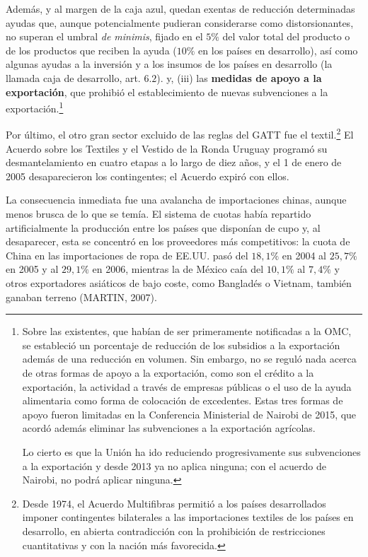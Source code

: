 \documentclass[10pt,a4paper]{article}
\begin{document}
{  Además, y al margen de la caja azul, quedan exentas de reducción determinadas ayudas que, aunque potencialmente pudieran considerarse como distorsionantes, no superan el umbral \textit{de minimis}, fijado en el $5\%$ del valor total del producto o de los productos que reciben la ayuda ($10\%$ en los países en desarrollo), así como algunas ayudas a la inversión y a los insumos de los países en desarrollo (la llamada caja de desarrollo, art. $6.2$).
} y, (iii) las \textbf{medidas de apoyo a la exportación}, que prohibió el establecimiento de nuevas subvenciones a la exportación.\footnote{%
  Sobre las existentes, que habían de ser primeramente notificadas a la OMC, se estableció un porcentaje de reducción de los subsidios a la exportación además de una reducción en volumen. Sin embargo, no se reguló nada acerca de otras formas de apoyo a la exportación, como son el crédito a la exportación, la actividad a través de empresas públicas o el uso de la ayuda alimentaria como forma de colocación de excedentes. Estas tres formas de apoyo fueron limitadas en la Conferencia Ministerial de Nairobi de 2015, que acordó además eliminar las subvenciones a la exportación agrícolas. 

Lo cierto es que la Unión ha ido reduciendo progresivamente sus subvenciones a la exportación y desde 2013 ya no aplica ninguna; con el acuerdo de Nairobi, no podrá aplicar ninguna.
}

Por último, el otro gran sector excluido de las reglas del GATT fue el textil.\footnote{%
  Desde 1974, el Acuerdo Multifibras permitió a los países desarrollados imponer contingentes bilaterales a las importaciones textiles de los países en desarrollo, en abierta contradicción con la prohibición de restricciones cuantitativas y con la nación más favorecida.
} El Acuerdo sobre los Textiles y el Vestido de la Ronda Uruguay programó su desmantelamiento en cuatro etapas a lo largo de diez años, y el 1 de enero de 2005 desaparecieron los contingentes; el Acuerdo expiró con ellos.

La consecuencia inmediata fue una avalancha de importaciones chinas, aunque menos brusca de lo que se temía. El sistema de cuotas había repartido artificialmente la producción entre los países que disponían de cupo y, al desaparecer, esta se concentró en los proveedores más competitivos: la cuota de China en las importaciones de ropa de EE.UU. pasó del $18,1\%$ en 2004 al $25,7\%$ en 2005 y al $29,1\%$ en 2006, mientras la de México caía del $10,1\%$ al $7,4\%$ y otros exportadores asiáticos de bajo coste, como Bangladés o Vietnam, también ganaban terreno (MARTIN, 2007).
\end{document}
